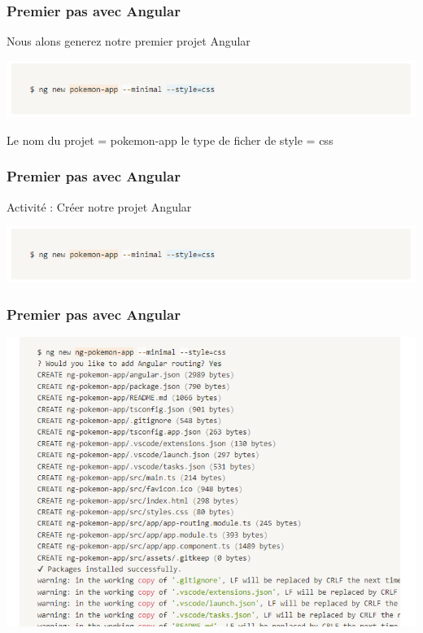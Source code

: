 \documentclass[10pt]{beamer}
\begin{document}
	\begin{frame}
		\frametitle{Premier pas avec Angular}

		Nous alons generez notre premier projet Angular \newline \newline

		\includegraphics[width=16cm]{assets/angularsetup} \newline \newline

		Le nom du projet = pokemon-app \newline
		le type de ficher de style = css

	\end{frame}


	\begin{frame}
		\frametitle{Premier pas avec Angular}

		Activité : \newline
		Créer notre projet Angular \newline \newline

		\includegraphics[width=17cm]{assets/angularsetup} \newline \newline

	\end{frame}

	\begin{frame}
		\frametitle{Premier pas avec Angular}

		\includegraphics[width=15cm]{assets/angularsetup2} \newline \newline

	\end{frame}
\end{document}
